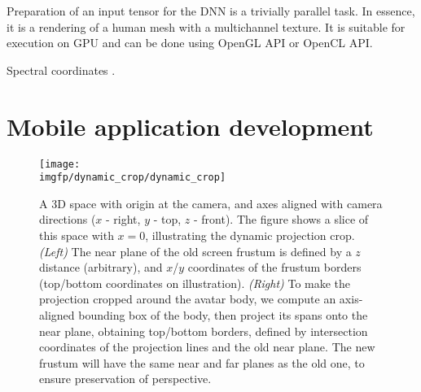 Preparation of an input tensor for the DNN is a trivially parallel task. In essence, it is a rendering of a human mesh with a multichannel texture. It is suitable for execution on GPU and can be done using OpenGL API or OpenCL API.

Spectral coordinates \cite{aux:spectral10}.

\section{Mobile application development}
\label{methods:app}
\begin{figure}
	\centering
	\texttt{[image: \\imgfp/dynamic\_crop/dynamic\_crop]}
	\caption{A 3D space with origin at the camera, and axes aligned with camera directions ($x$ - right, $y$ - top, $z$ - front). The figure shows a slice of this space with $x=0$, illustrating the dynamic projection crop. \textit{(Left)} The near plane of the old screen frustum is defined by a $z$ distance (arbitrary), and $x$/$y$ coordinates of the frustum borders (top/bottom coordinates on illustration). \textit{(Right)} To make the projection cropped around the avatar body, we compute an axis-aligned bounding box of the body, then project its spans onto the near plane, obtaining top/bottom borders, defined by intersection coordinates of the projection lines and the old near plane. The new frustum will have the same near and far planes as the old one, to ensure preservation of perspective.}
	\label{fig:dynamic_crop_math}
\end{figure}

